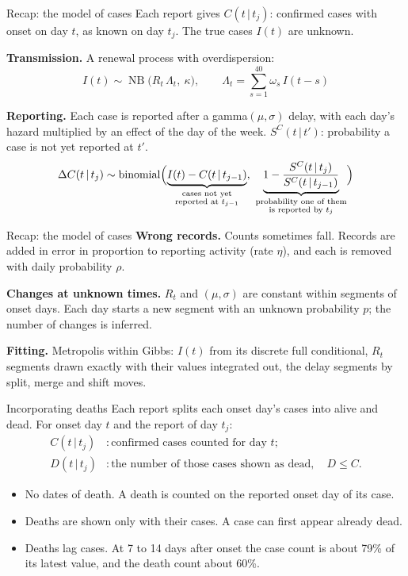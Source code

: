 \documentclass[aspectratio=169,9pt]{beamer}
\newcommand{\given}{\,|\,}
\newcommand{\bin}{\operatorname{binomial}}
\begin{document}
\begin{frame}{Recap: the model of cases}
Each report gives $C(t\given t_j)$: confirmed cases with onset on day $t$, as
known on day $t_j$. The true cases $I(t)$ are unknown.

\bigskip
\textbf{Transmission.} A renewal process with overdispersion:
\[
I(t)\sim\operatorname{NB}\bigl(R_t\,\Lambda_t,\ \kappa\bigr),\qquad
\Lambda_t=\sum_{s=1}^{40}\omega_s\,I(t-s)
\]

\textbf{Reporting.} Each case is reported after a gamma$(\mu,\sigma)$ delay,
with each day's hazard multiplied by an effect of the day of the week.
$S^{C}(t\given t')$: probability a case is not yet reported at $t'$.
\[
\Delta C(t\given t_j)\sim\bin\Bigl(\underbrace{I(t)-C(t\given t_{j-1})}_{\substack{\text{cases not yet}\\\text{reported at }t_{j-1}}},\
\underbrace{1-\frac{S^{C}(t\given t_j)}{S^{C}(t\given t_{j-1})}}_{\substack{\text{probability one of them}\\\text{is reported by }t_j}}\Bigr)
\]
\end{frame}

\begin{frame}{Recap: the model of cases}
\textbf{Wrong records.} Counts sometimes fall. Records are added in error
in proportion to reporting activity (rate $\eta$), and each is removed with
daily probability $\rho$.

\bigskip
\textbf{Changes at unknown times.} $R_t$ and $(\mu,\sigma)$ are constant
within segments of onset days. Each day starts a new segment with an
unknown probability $p$; the number of changes is inferred.

\bigskip
\textbf{Fitting.} Metropolis within Gibbs: $I(t)$ from its discrete full
conditional, $R_t$ segments drawn exactly with their values integrated out,
the delay segments by split, merge and shift moves.
\end{frame}

\begin{frame}{Incorporating deaths}
Each report splits each onset day's cases into alive and dead. For onset
day $t$ and the report of day $t_j$:
\begin{align*}
C(t\given t_j) &: \text{confirmed cases counted for day $t$};\\
D(t\given t_j) &: \text{the number of those cases shown as dead},\quad D\le C.
\end{align*}

\begin{itemize}
\item No dates of death. A death is counted on the reported onset
day of its case.
\item Deaths are shown only with their cases. A case can first
appear already dead.
\item Deaths lag cases. At 7 to 14 days after onset the case count
is about 79\% of its latest value, and the death count about  60\%.
\end{itemize}
\end{frame}
\end{document}
